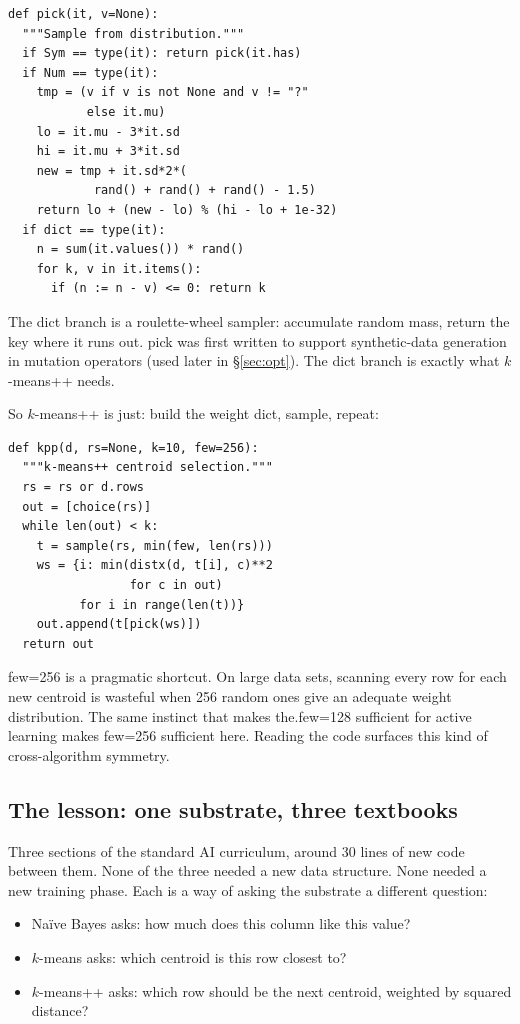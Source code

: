 \documentclass[AMA,STIX2COL]{WileyNJDv5}
\begin{document}
\begin{verbatim}
def pick(it, v=None):
  """Sample from distribution."""
  if Sym == type(it): return pick(it.has)
  if Num == type(it):
    tmp = (v if v is not None and v != "?"
           else it.mu)
    lo = it.mu - 3*it.sd
    hi = it.mu + 3*it.sd
    new = tmp + it.sd*2*(
            rand() + rand() + rand() - 1.5)
    return lo + (new - lo) % (hi - lo + 1e-32)
  if dict == type(it):
    n = sum(it.values()) * rand()
    for k, v in it.items():
      if (n := n - v) <= 0: return k
\end{verbatim}

The dict branch is a roulette-wheel sampler: accumulate random
mass, return the key where it runs out. \textsf{pick} was first
written to support synthetic-data generation in mutation
operators (used later in \S\ref{sec:opt}). The dict branch is
exactly what $k$-means++ needs.

So $k$-means++ is just: build the weight dict, sample, repeat:

\begin{verbatim}
def kpp(d, rs=None, k=10, few=256):
  """k-means++ centroid selection."""
  rs = rs or d.rows
  out = [choice(rs)]
  while len(out) < k:
    t = sample(rs, min(few, len(rs)))
    ws = {i: min(distx(d, t[i], c)**2
                 for c in out)
          for i in range(len(t))}
    out.append(t[pick(ws)])
  return out
\end{verbatim}

\textsf{few=256} is a pragmatic shortcut. On large data sets,
scanning every row for each new centroid is wasteful when 256
random ones give an adequate weight distribution. The same
instinct that makes \textsf{the.few=128} sufficient for active
learning makes \textsf{few=256} sufficient here. Reading the
code surfaces this kind of cross-algorithm symmetry.

\subsection*{The lesson: one substrate, three textbooks}

Three sections of the standard AI curriculum, around 30 lines
of new code between them. None of the three needed a new data
structure. None needed a new training phase. Each is a way of
asking the substrate a different question:

\begin{itemize}
\item Naïve Bayes asks: how much does this column like this
value?
\item $k$-means asks: which centroid is this row closest to?
\item $k$-means++ asks: which row should be the next centroid,
weighted by squared distance?
\end{itemize}
\end{document}
